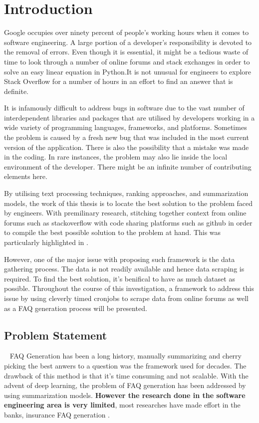 \chapter{Introduction}
Google occupies over ninety percent of people's working hours when it comes to software engineering. A large portion of a developer's responsibility is devoted to the removal of errors. Even though it is essential, it might be a tedious waste of time to look through a number of online forums and stack exchanges in order to solve an easy linear equation in Python\cite{bugs_nightmare}.It is not unusual for engineers to explore Stack Overflow for a number of hours in an effort to find an answer that is definite.

It is infamously difficult to address bugs in software due to the vast number of interdependent libraries and packages that are utilised by developers working in a wide variety of programming languages, frameworks, and platforms. Sometimes the problem is caused by a fresh new bug that was included in the most current version of the application. There is also the possibility that a mistake was made in the coding. In rare instances, the problem may also lie inside the local environment of the developer. There might be an infinite number of contributing elements here.

By utilising text processing techniques, ranking approaches, and summarization models, the work of this thesis is to locate the best solution to the problem faced by engineers. With premilinary research, stitching together context from online forums such as stackoverflow with code sharing platforms such as github in order to compile the best possible solution to the problem at hand. This was particularly highlighted in \cite{8816796}. 

However, one of the major issue with proposing such framework is the data gathering process. The data is not readily available and hence data scraping is required. To find the best solution, it's benifical to have as much dataset as possible. Throughout the course of this investigation, a framework to address this issue by using cleverly timed cronjobs to scrape data from online forums as well as a FAQ generation process will be presented.

\vspace{1cm}
\pagebreak
\section{Problem Statement}~\label{ch:problem_statement}
FAQ Generation has been a long history, manually summarizing and cherry picking the best anwers to a question was the framework used for decades. The drawback of this method is that it's time consuming and not scalable\cite{}. With the advent of deep learning, the problem of FAQ generation has been addressed by using summarization models. \textbf{However the research done in the software engineering area is very limited}, most researches have made effort in the banks, insurance FAQ generation \cite{}. 

